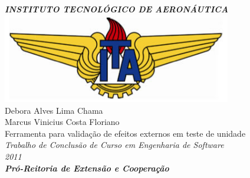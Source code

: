 \begin{titlepage}
	
\begin{center}
\uppercase{\LARGE \bfseries \emph{INSTITUTO TECNOLÓGICO DE AERONÁUTICA}}\\[1.5cm]

\includegraphics[width=0.75\textwidth]{./ita}\\[1.5cm]

\textnormal{\large Debora Alves Lima Chama}\\[-0.3cm]
\textnormal{\large Marcus Vinicius Costa Floriano}\\[1.5cm]

\textnormal{\Large Ferramenta para validação de efeitos externos em teste de unidade}\\[1.7cm]

\textnormal{\LARGE \emph{Trabalho de Conclusão de Curso em Engenharia de Software}}\\[0.1cm]
\textnormal{\LARGE \emph{2011}}\\[1.2cm]

\textnormal{\Huge \bfseries \emph{Pró-Reitoria de Extensão e Cooperação}}\\[0cm]

\end{center}

\end{titlepage}

